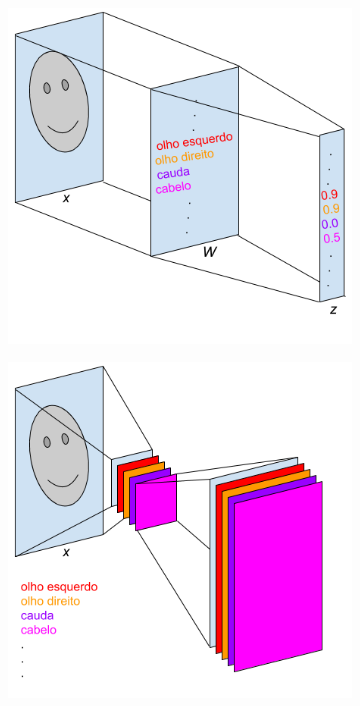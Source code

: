 \begin{figure}[ht!]
	\caption{Imagem ilustrativa das possíveis projeções aprendidas em uma camada (a) densa e (b) convolucional em um problema de reconhecimento de faces.}
	\begin{center}
	\begin{subfigure}{0.6\textwidth}
		\centering
		\includegraphics[width=.85\linewidth]{figuras/projlin.png}
		\caption{}
	\end{subfigure}%
	\vspace{.05\linewidth}
	\begin{subfigure}{0.6\textwidth}
		\centering
		\includegraphics[width=.85\linewidth]{figuras/projcon.png}

\end{subfigure}
\end{center}
\end{figure}
